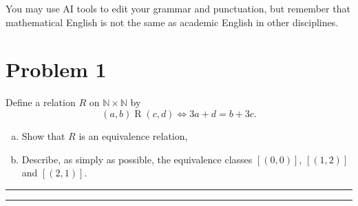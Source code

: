 \documentclass{article}
\theoremstyle{definition}
\newenvironment{solution}{\bigskip\hrule{\hfill}}{\bigskip\hrule{\hfill}} %
\begin{document}
You may use AI tools to edit your grammar and punctuation, but remember that mathematical English is not the same as academic English in other disciplines. 

\vfill

\newpage


\section*{Problem 1}
Define a relation $R$ on $\mathbb{N}\times\mathbb{N}$ by $$\left(a,b\right)\mathrel{R}\left(c,d\right)\Longleftrightarrow3a+d=b+3c.$$
\begin{enumerate}[a)] %
    \item Show that $R$ is an equivalence relation,
    \item Describe, as simply as possible, the equivalence classes $\left[\left(0,0\right)\right]$, $\left[\left(1,2\right)\right]$ and $\left[\left(2,1\right)\right]$.
\end{enumerate}
\begin{solution}


\end{solution}


\newpage

\end{document}

